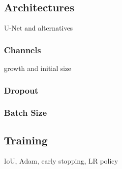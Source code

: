\subsection{Architectures}

U-Net and alternatives

\subsubsection{Channels}

growth and initial size

\subsubsection{Dropout}

\subsubsection{Batch Size}

\subsection{Training}

IoU, Adam, early stopping, LR policy

\newpage
